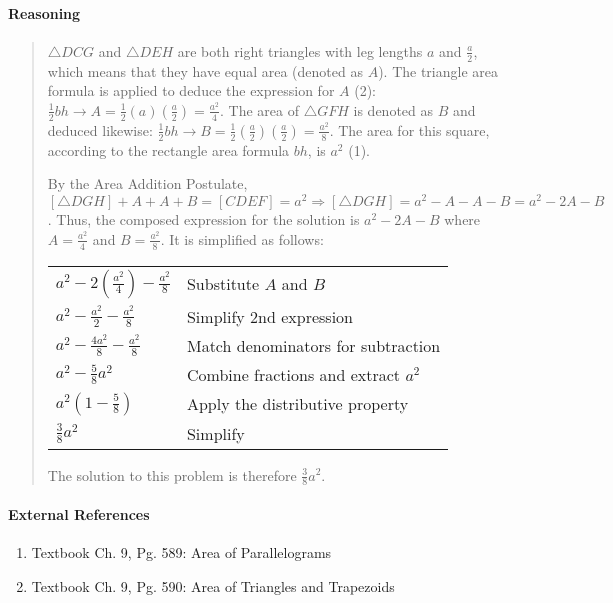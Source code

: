 \documentclass[letterpaper,12pt,twoside]{report}
\begin{document}
	\paragraph{Reasoning}
	\begin{quotation}
	
	$\triangle DCG$ and $\triangle DEH$ are both right triangles with leg lengths $a$ and $\frac{a}{2}$, which means that they have equal area (denoted as $A$). The triangle area formula is applied to deduce the expression for $A$ (2): $\frac{1}{2}bh \rightarrow A=\frac{1}{2}(a)(\frac{a}{2})=\frac{a^2}{4}$. The area of $\triangle GFH$ is denoted as $B$ and deduced likewise: $\frac{1}{2}bh \rightarrow B=\frac{1}{2}(\frac{a}{2})(\frac{a}{2})=\frac{a^2}{8}$. The area for this square, according to the rectangle area formula $bh$, is $a^2$ (1).
	
	By the Area Addition Postulate, $[\triangle DGH]+A+A+B=[CDEF]=a^2 \Rightarrow [\triangle DGH]=a^2-A-A-B=a^2-2A-B$. Thus, the composed expression for the solution is $a^2-2A-B$ where $A=\frac{a^2}{4}$ and $B=\frac{a^2}{8}$. It is simplified as follows:
	\begin{center}
		\begin{tabular}{l | l}
			$a^2-2(\frac{a^2}{4})-\frac{a^2}{8}$ & Substitute $A$ and $B$ \\
			$a^2-\frac{a^2}{2}-\frac{a^2}{8}$ & Simplify 2nd expression \\
			$a^2-\frac{4a^2}{8}-\frac{a^2}{8}$ & Match denominators for subtraction \\
			$a^2-\frac{5}{8}a^2$ & Combine fractions and extract $a^2$ \\
			$a^2(1-\frac{5}{8})$ & Apply the distributive property \\
			$\frac{3}{8}a^2$ & Simplify \\
		\end{tabular}
	\end{center}
	
	The solution to this problem is therefore $\boxed{\frac{3}{8}a^2}$.
	\end{quotation}
	
	\paragraph{External References}
	
	\begin{enumerate}
		\item Textbook Ch. 9, Pg. 589: Area of Parallelograms
		\item Textbook Ch. 9, Pg. 590: Area of Triangles and Trapezoids
	\end{enumerate}
\end{document}
